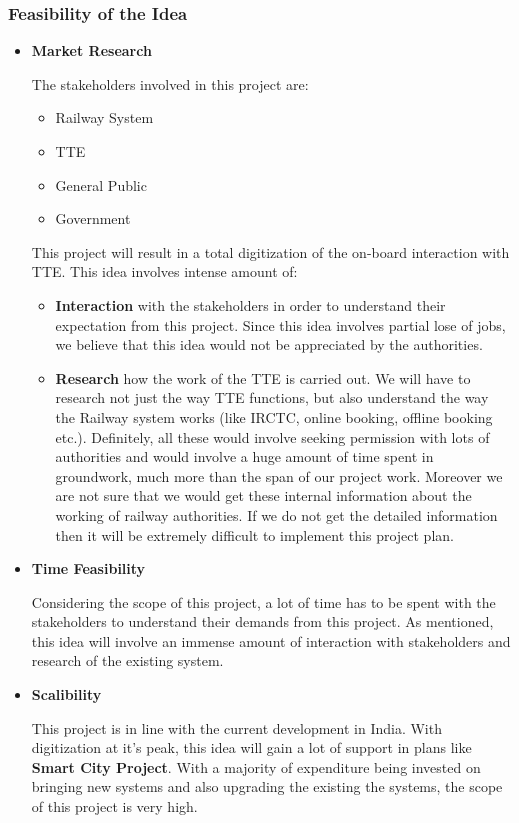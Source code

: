 \documentclass{article}
\begin{document}
\subsubsection{Feasibility of the Idea}

\begin{itemize}
    \item \textbf{Market Research}
    \par The stakeholders involved in this project are:
    \begin{itemize}
        \item Railway System
        \item TTE
        \item General Public
        \item Government
    \end{itemize}
    \par This project will result in a total digitization of the on-board interaction with TTE. This idea involves intense amount of:
    \begin{itemize}
        \item \textbf{Interaction} with the stakeholders in order to understand their expectation from this project. Since this idea involves partial lose of jobs, we believe that this idea would not be appreciated by the authorities.
        \item \textbf{Research} how the work of the TTE is carried out. We will have to research not just the way TTE functions, but also understand the way the Railway system works (like IRCTC, online booking, offline booking etc.). Definitely, all these would involve seeking permission with lots of authorities and would involve a huge amount of time spent in groundwork, much more than the span of our project work. Moreover we are not sure that we would get these internal information about the working of railway authorities. If we do not get the detailed information then it will be extremely difficult to implement this project plan. 
    \end{itemize}
    \item \textbf{Time Feasibility}
    \par Considering the scope of this project, a lot of time has to be spent with the stakeholders to understand their demands from this project. As mentioned, this idea will involve an immense amount of interaction with stakeholders and research of the existing system. 
    \item \textbf{Scalibility}
    \par This project is in line with the current development in India. With digitization at it's peak, this idea will gain a lot of support in plans like \textbf{Smart City Project}. With a majority of expenditure being invested on bringing new systems and also upgrading the existing the systems, the scope of this project is very high.
    
\end{itemize}
\end{document}
